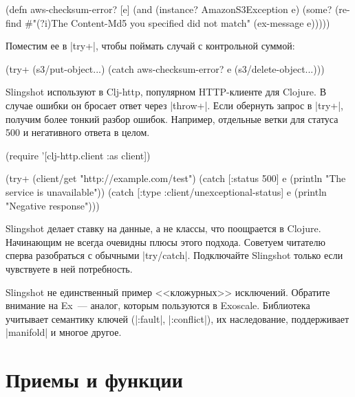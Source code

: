 \begin{english}
  \begin{clojure}
(defn aws-checksum-error? [e]
  (and (instance? AmazonS3Exception e)
       (some?
        (re-find
         #"(?i)The Content-Md5 you specified did not match"
         (ex-message e)))))
  \end{clojure}
\end{english}

Поместим ее в \spverb|try+|, чтобы поймать случай с контрольной суммой:

\begin{english}
  \begin{clojure}
(try+
  (s3/put-object...)
  (catch aws-checksum-error? e
    (s3/delete-object...)))
  \end{clojure}
\end{english}

Slingshot используют в Clj-http,
популярном HTTP-клиенте для Clojure. В случае ошибки он бросает ответ через
\spverb|throw+|. Если обернуть запрос в \spverb|try+|, получим более тонкий
разбор ошибок. Например, отдельные ветки для статуса 500 и негативного ответа в
целом.

\begin{english}
  \begin{clojure}
(require '[clj-http.client :as client])

(try+
 (client/get "http://example.com/test")
 (catch [:status 500] e
   (println "The service is unavailable"))
 (catch [:type :client/unexceptional-status] e
   (println "Negative response")))
  \end{clojure}
\end{english}

Slingshot делает ставку на данные, а не классы, что поощрается в
Clojure. Начинающим не всегда очевидны плюсы этого подхода. Советуем читателю
сперва разобраться с обычными \spverb|try/catch|. Подключайте Slingshot только
если чувствуете в ней потребность.

Slingshot не единственный пример <<кложурных>> исключений. Обратите внимание на
Ex~--- аналог, которым пользуются в
Exoscale. Библиотека учитывает семантику ключей (\spverb|:fault|,
\spverb|:conflict|), их наследование, поддерживает \spverb|manifold| и многое
другое.

\section{Приемы и функции}

